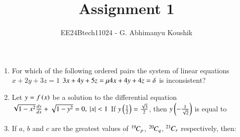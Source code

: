 \documentclass[journal,12pt,onecolumn]{IEEEtran}
\theoremstyle{remark}
\begin{document}
\title{Assignment 1}
\author{EE24Btech11024 - G. Abhimanyu Koushik}
\maketitle
\renewcommand{\thefigure}{\theenumi}
\renewcommand{\thetable}{\theenumi}
\begin{enumerate}

\item For which of the following ordered pairs \brak{\mu,\delta} the system of linear equations\newline
$x+2y+3z=1$\newline
$3x+4y+5z=\mu\newline
4x+4y+4z=\delta$\newline
is inconsistent?

\hfill{}
\begin{enumerate}
\end{enumerate}

\item Let $y=f\left(x\right)$ be a solution to the differential equation\newline
$\sqrt{1-x^2}\frac{dy}{dx}+\sqrt{1-y^2} = 0 \text{, } \left\vert x\right\vert<1$\newline
If $y\left(\frac{1}{2}\right) = \frac{\sqrt{3}}{2}$, then $y\left(-\frac{1}{\sqrt{2}}\right)$ is equal to

\hfill{}
\begin{enumerate}
\end{enumerate}

\item If $a$, $b$ and $c$ are the greatest values of ${{}^{19}\mkern-1muC_{p}}$, ${{}^{20}\mkern-1muC_{q}}$, ${{}^{21}\mkern-1muC_{r}}$ respectively, then:

\hfill{}
\begin{enumerate}
\end{enumerate}


\end{enumerate}
\end{document}
